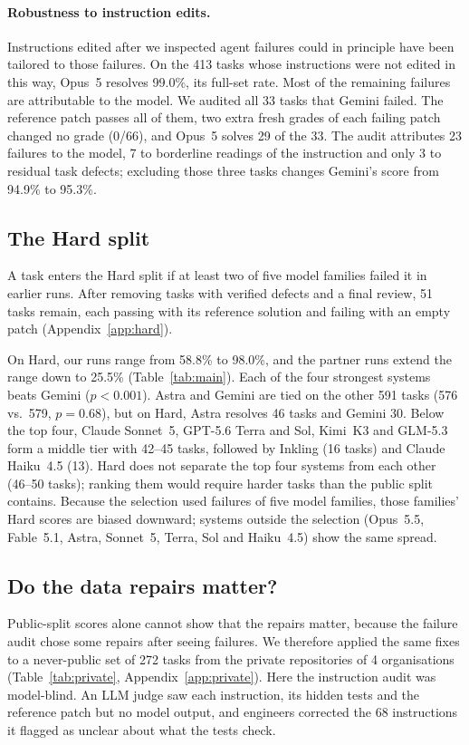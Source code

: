 \paragraph{Robustness to instruction edits.} Instructions edited after we inspected agent failures could in principle have been tailored to those failures. On the 413 tasks whose instructions were not edited in this way, Opus~5 resolves 99.0\%, its full-set rate. Most of the remaining failures are attributable to the model. We audited all 33 tasks that Gemini failed. The reference patch passes all of them, two extra fresh grades of each failing patch changed no grade (0/66), and Opus~5 solves 29 of the 33. The audit attributes 23 failures to the model, 7 to borderline readings of the instruction and only 3 to residual task defects; excluding those three tasks changes Gemini's score from 94.9\% to 95.3\%.

\subsection{The Hard split}
\label{sec:hard}
A task enters the Hard split if at least two of five model families failed it in earlier runs. After removing tasks with verified defects and a final review, 51 tasks remain, each passing with its reference solution and failing with an empty patch (Appendix~\ref{app:hard}).

On Hard, our runs range from 58.8\% to 98.0\%, and the partner runs extend the range down to 25.5\% (Table~\ref{tab:main}). Each of the four strongest systems beats Gemini ($p<0.001$). Astra and Gemini are tied on the other 591 tasks (576 vs.\ 579, $p=0.68$), but on Hard, Astra resolves 46 tasks and Gemini 30. Below the top four, Claude Sonnet~5, GPT-5.6 Terra and Sol, Kimi~K3 and GLM-5.3 form a middle tier with 42--45 tasks, followed by Inkling (16 tasks) and Claude Haiku~4.5 (13). Hard does not separate the top four systems from each other (46--50 tasks); ranking them would require harder tasks than the public split contains. Because the selection used failures of five model families, those families' Hard scores are biased downward; systems outside the selection (Opus~5.5, Fable~5.1, Astra, Sonnet~5, Terra, Sol and Haiku~4.5) show the same spread.

\subsection{Do the data repairs matter?}
\label{sec:private}

Public-split scores alone cannot show that the repairs matter, because the failure audit chose some repairs after seeing failures. We therefore applied the same fixes to a never-public set of 272 tasks from the private repositories of 4 organisations (Table~\ref{tab:private}, Appendix~\ref{app:private}). Here the instruction audit was model-blind. An LLM judge saw each instruction, its hidden tests and the reference patch but no model output, and engineers corrected the 68 instructions it flagged as unclear about what the tests check.

